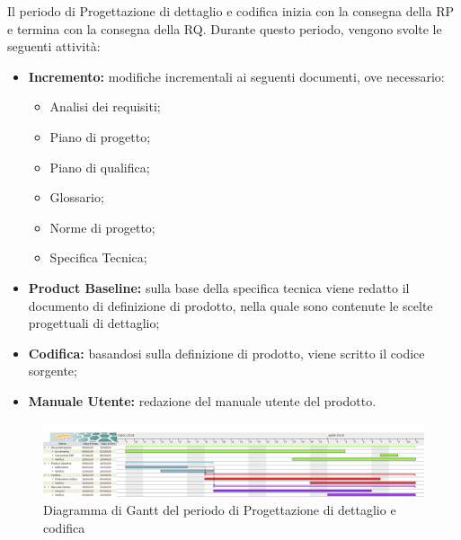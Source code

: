 Il periodo di Progettazione di dettaglio e codifica inizia con la consegna della RP e termina con la consegna della RQ.\newline
Durante questo periodo, vengono svolte le seguenti attività:
\begin{itemize}
	\item \textbf{Incremento: }modifiche incrementali ai seguenti documenti, ove necessario:
	\begin{itemize}
		\item Analisi dei requisiti;
		\item Piano di progetto;
		\item Piano di qualifica;
		\item Glossario;
		\item Norme di progetto;
		\item Specifica Tecnica;
	\end{itemize}
	\item \textbf{Product Baseline: }sulla base della specifica tecnica viene redatto il documento di definizione di prodotto, nella quale sono contenute le scelte progettuali di dettaglio;
	\item \textbf{Codifica: }basandosi sulla definizione di prodotto, viene scritto il codice sorgente;
	\item \textbf{Manuale Utente: }redazione del manuale utente del prodotto. 
\end{itemize}


\begin{figure}[H]
	\includegraphics[width=1\linewidth]{Pianificazione/Progettazione_Dettaglio_Codififca.png}
	\caption{Diagramma di Gantt del periodo di Progettazione di dettaglio e codifica}
\end{figure}